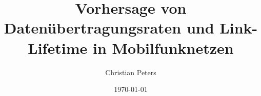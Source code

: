 \documentclass[a4paper,12pt,bibliography=totoc]{scrartcl}
\title{Vorhersage von Daten\"ubertragungsraten und Link-Lifetime in Mobilfunknetzen}
\author{Christian Peters}
\date{\today}
\begin{document}


\newpage
\tableofcontents
\thispagestyle{empty}

\newpage

\setcounter{page}{1}











\newpage

\nocite{XGBoost, IEEE}


\end{document}
